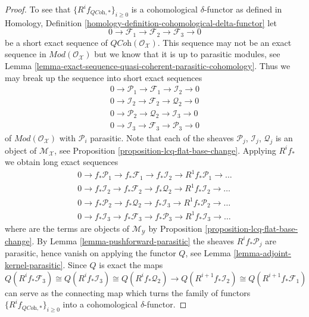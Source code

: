\begin{proof}
\medskip\noindent
To see that $\{R^if_{\textit{QCoh}, *}\}_{i \geq 0}$ is a cohomological
$\delta$-functor as defined in
Homology, Definition \ref{homology-definition-cohomological-delta-functor}
let
$$
0 \to \mathcal{F}_1 \to \mathcal{F}_2 \to \mathcal{F}_3 \to 0
$$
be a short exact sequence of $\textit{QCoh}(\mathcal{O}_\mathcal{X})$.
This sequence may not be an exact sequence in
$\textit{Mod}(\mathcal{O}_\mathcal{X})$ but we know that it is
up to parasitic modules, see
Lemma \ref{lemma-exact-sequence-quasi-coherent-parasitic-cohomology}.
Thus we may break up the sequence into short exact sequences
$$
\begin{matrix}
0 \to \mathcal{P}_1 \to \mathcal{F}_1 \to \mathcal{I}_2 \to 0 \\
0 \to \mathcal{I}_2 \to \mathcal{F}_2 \to \mathcal{Q}_2 \to 0 \\
0 \to \mathcal{P}_2 \to \mathcal{Q}_2 \to \mathcal{I}_3 \to 0 \\
0 \to \mathcal{I}_3 \to \mathcal{F}_3 \to \mathcal{P}_3 \to 0
\end{matrix}
$$
of $\textit{Mod}(\mathcal{O}_\mathcal{X})$ with $\mathcal{P}_i$ parasitic.
Note that each of the sheaves
$\mathcal{P}_j$, $\mathcal{I}_j$, $\mathcal{Q}_j$ is an object of
$\mathcal{M}_\mathcal{X}$, see
Proposition \ref{proposition-lcq-flat-base-change}.
Applying $R^if_*$ we obtain long exact sequences 
$$
\begin{matrix}
0 \to f_*\mathcal{P}_1 \to f_*\mathcal{F}_1 \to f_*\mathcal{I}_2 \to
R^1f_*\mathcal{P}_1 \to \ldots \\
0 \to f_*\mathcal{I}_2 \to f_*\mathcal{F}_2 \to f_*\mathcal{Q}_2 \to
R^1f_*\mathcal{I}_2 \to \ldots \\
0 \to f_*\mathcal{P}_2 \to f_*\mathcal{Q}_2 \to f_*\mathcal{I}_3 \to
R^1f_*\mathcal{P}_2 \to \ldots \\
0 \to f_*\mathcal{I}_3 \to f_*\mathcal{F}_3 \to f_*\mathcal{P}_3 \to
R^1f_*\mathcal{I}_3 \to \ldots
\end{matrix}
$$
where are the terms are objects of $\mathcal{M}_\mathcal{Y}$ by
Proposition \ref{proposition-lcq-flat-base-change}.
By
Lemma \ref{lemma-pushforward-parasitic}
the sheaves $R^if_*\mathcal{P}_j$ are parasitic, hence vanish on applying
the functor $Q$, see
Lemma \ref{lemma-adjoint-kernel-parasitic}.
Since $Q$ is exact the maps
$$
Q(R^if_*\mathcal{F}_3)
\cong
Q(R^if_*\mathcal{I}_3)
\cong
Q(R^if_*\mathcal{Q}_2)
\rightarrow
Q(R^{i + 1}f_*\mathcal{I}_2)
\cong
Q(R^{i + 1}f_*\mathcal{F}_1)
$$
can serve as the connecting map which turns the family of functors
$\{R^if_{\textit{QCoh}, *}\}_{i \geq 0}$
into a cohomological $\delta$-functor.
\end{proof}

